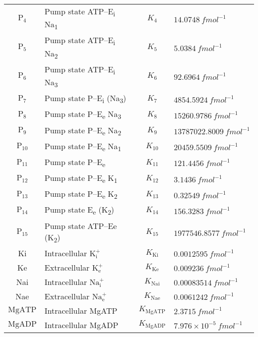 \documentclass[11pt]{article}
\begin{document}
\begin{table}[H]
\begin{tabular}{cl c l}
		$\text{P}_4$ & Pump state ATP--E\textsubscript{i} Na\textsubscript{1}
		 & $K_4$ & $14.0748\ \si{fmol^{-1}}$ \\ 
		$\text{P}_5$ & Pump state ATP--E\textsubscript{i} Na\textsubscript{2}
		 & $K_5$ & $5.0384\ \si{fmol^{-1}}$ \\ 
		$\text{P}_6$ & Pump state ATP--E\textsubscript{i} Na\textsubscript{3}
		 & $K_6$ & $92.6964\ \si{fmol^{-1}}$ \\ 
		$\text{P}_7$ & Pump state P--E\textsubscript{i} (Na\textsubscript{3})
		 & $K_7$ & $4854.5924\ \si{fmol^{-1}}$ \\ 
		$\text{P}_8$ & Pump state P--E\textsubscript{e} Na\textsubscript{3}
		 & $K_8$ & $15260.9786\ \si{fmol^{-1}}$ \\ 
		$\text{P}_9$ & Pump state P--E\textsubscript{e} Na\textsubscript{2}
		 & $K_9$ & $13787022.8009\ \si{fmol^{-1}}$ \\ 
		$\text{P}_{10}$ & Pump state P--E\textsubscript{e} Na\textsubscript{1}
		 & $K_{10}$ & $20459.5509\ \si{fmol^{-1}}$ \\ 
		$\text{P}_{11}$ & Pump state P--E\textsubscript{e}
		 & $K_{11}$ & $121.4456\ \si{fmol^{-1}}$ \\ 
		$\text{P}_{12}$ & Pump state P--E\textsubscript{e} K\textsubscript{1}
		 & $K_{12}$ & $3.1436\ \si{fmol^{-1}}$ \\ 
		$\text{P}_{13}$ & Pump state P--E\textsubscript{e} K\textsubscript{2}
		 & $K_{13}$ & $0.32549\ \si{fmol^{-1}}$ \\ 
		$\text{P}_{14}$ & Pump state E\textsubscript{e} (K\textsubscript{2})
		& $K_{14}$ & $156.3283\ \si{fmol^{-1}}$ \\ 
		$\text{P}_{15}$ & Pump state ATP--Ee (K\textsubscript{2})
		& $K_{15}$ & $1977546.8577\ \si{fmol^{-1}}$ \\ 
		Ki & Intracellular $\text{K}_\text{i}^+$ & $K_\text{Ki}$ & $0.0012595\ \si{fmol^{-1}}$ \\ 
		Ke & Extracellular $\text{K}_\text{e}^+$ & $K_\text{Ke}$ & $0.009236\ \si{fmol^{-1}}$ \\ 
		Nai & Intracellular $\text{Na}_\text{i}^+$ & $K_\text{Nai}$ & $0.00083514\ \si{fmol^{-1}}$ \\ 
		Nae & Extracellular $\text{Na}_\text{e}^+$ & $K_\text{Nae}$ & $0.0061242\ \si{fmol^{-1}}$ \\ 
		$\text{MgATP}$ & Intracellular MgATP & $K_\text{MgATP}$ & $2.3715\ \si{fmol^{-1}}$ \\ 
		$\text{MgADP}$ & Intracellular MgADP & $K_\text{MgADP}$ & $7.976 \times 10^{-5} \ \si{fmol^{-1}}$ \\ 

\end{tabular}
\end{table}
\end{document}
